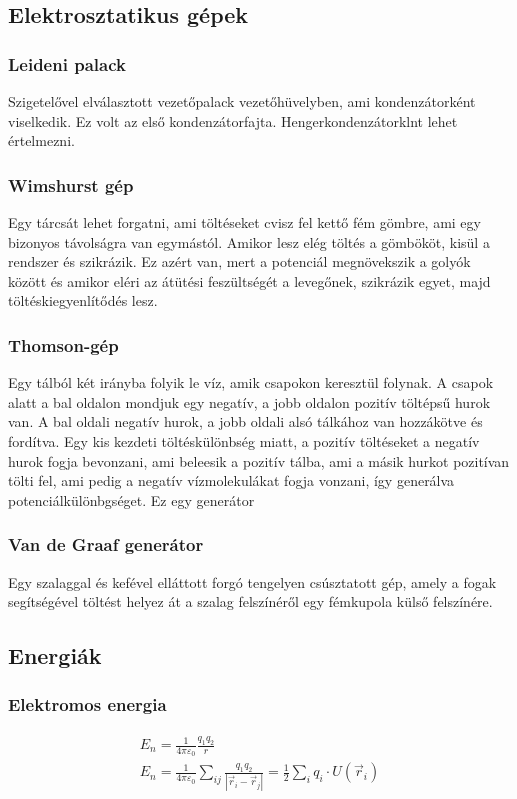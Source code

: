 \documentclass{article}
\begin{document}
\subsection{Elektrosztatikus gépek}
\subsubsection{Leideni palack}
Szigetelővel elválasztott vezetőpalack vezetőhüvelyben, ami kondenzátorként viselkedik. Ez volt az első kondenzátorfajta. Hengerkondenzátorklnt  lehet értelmezni. 
\subsubsection{Wimshurst gép}
Egy tárcsát lehet forgatni, ami töltéseket cvisz fel kettő fém gömbre, ami egy bizonyos távolságra van egymástól. Amikor lesz elég töltés a gömbököt, kisül a rendszer és szikrázik. Ez azért van, mert a potenciál megnövekszik a golyók között és amikor eléri az átütési feszültségét a levegőnek, szikrázik egyet, majd töltéskiegyenlítődés lesz.
\subsubsection{Thomson-gép}
Egy tálból két irányba folyik le víz, amik csapokon keresztül folynak. A csapok alatt a bal oldalon mondjuk egy negatív, a jobb oldalon pozitív töltépsű hurok van. A bal oldali negatív hurok, a jobb oldali alsó tálkához van hozzákötve és fordítva. Egy kis kezdeti töltéskülönbség miatt, a pozitív töltéseket a negatív hurok fogja bevonzani, ami beleesik a pozitív tálba, ami a másik hurkot pozitívan tölti fel, ami pedig a negatív vízmolekulákat fogja vonzani, így generálva potenciálkülönbgséget. Ez egy generátor 
\subsubsection{Van de Graaf generátor}
Egy szalaggal és kefével elláttott forgó tengelyen csúsztatott gép, amely a fogak segítségével töltést helyez át a szalag felszínéről egy fémkupola külső felszínére.
\subsection{Energiák}
\subsubsection{Elektromos energia}
\begin{gather*}
E_n = \frac{1}{4\pi \varepsilon_0} \frac{q_1 q_2}{r} \\
E_n = \frac{1}{4\pi \varepsilon_0} \sum_{ij} \frac{q_1 q_2}{|\vec{r}_i-\vec{r}_j|} = \frac{1}{2} \sum_{i} q_i \cdot U(\vec{r}_i)
\end{gather*}
\end{document}
